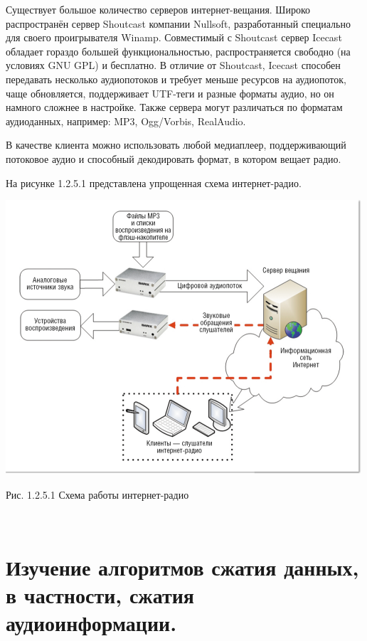 \documentclass[a4paper]{report}
\begin{document}
Существует большое количество серверов интернет-вещания. Широко распространён сервер Shoutcast компании Nullsoft, разработанный специально для своего проигрывателя Winamp. Совместимый с Shoutcast сервер Icecast обладает гораздо большей функциональностью, распространяется свободно (на условиях GNU GPL) и бесплатно. В отличие от Shoutcast, Icecast способен передавать несколько аудиопотоков и требует меньше ресурсов на аудиопоток, чаще обновляется, поддерживает UTF-теги и разные форматы аудио, но он намного сложнее в настройке. Также сервера могут различаться по форматам аудиоданных, например: MP3, Ogg/Vorbis, RealAudio.

В качестве клиента можно использовать любой медиаплеер, поддерживающий потоковое аудио и способный декодировать формат, в котором вещает радио.

На рисунке 1.2.5.1 представлена упрощенная схема интернет-радио.

\includegraphics[scale=0.9]{internet_radio}
{\centering\caption{\newline Рис. 1.2.5.1 Схема работы интернет-радио}\\}



\newpage
\chapter{Изучение алгоритмов сжатия данных, в частности, сжатия
аудиоинформации.}
\end{document}
